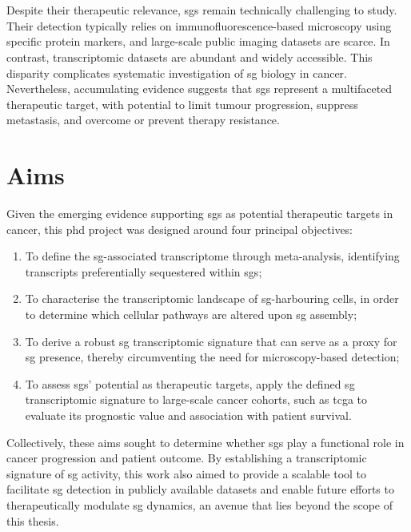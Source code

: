 \\
\\
Despite their therapeutic relevance, \glspl{sg} remain technically challenging to study. Their detection typically relies on immunofluorescence-based microscopy using specific protein markers\cite{glauninger_stressful_2022}, and large-scale public imaging datasets are scarce. In contrast, transcriptomic datasets are abundant and widely accessible\cite{tcga_research_network_cancer_nodate, schneider_voyager_2024}. This disparity complicates systematic investigation of \gls{sg} biology in cancer. Nevertheless, accumulating evidence suggests that \glspl{sg} represent a multifaceted therapeutic target, with potential to limit tumour progression, suppress metastasis, and overcome or prevent therapy resistance.

\section{Aims}

Given the emerging evidence supporting \glspl{sg} as potential therapeutic targets in cancer, this \gls{phd} project was designed around four principal objectives:

\begin{enumerate}
	\item To define the \gls{sg}-associated transcriptome through meta-analysis, identifying transcripts preferentially sequestered within \glspl{sg};
	\item To characterise the transcriptomic landscape of \gls{sg}-harbouring cells, in order to determine which cellular pathways are altered upon \gls{sg} assembly;
	\item To derive a robust \gls{sg} transcriptomic signature that can serve as a proxy for \gls{sg} presence, thereby circumventing the need for microscopy-based detection;
	\item To assess \glspl{sg}' potential as therapeutic targets, apply the defined \gls{sg} transcriptomic signature to large-scale cancer cohorts, such as \gls{tcga}\cite{network_cancer_nodate, heath_nci_2021} to evaluate its prognostic value and association with patient survival.
\end{enumerate}
\noindent
Collectively, these aims sought to determine whether \glspl{sg} play a functional role in cancer progression and patient outcome. By establishing a transcriptomic signature of \gls{sg} activity, this work also aimed to provide a scalable tool to facilitate \gls{sg} detection in publicly available datasets and enable future efforts to therapeutically modulate \gls{sg} dynamics, an avenue that lies beyond the scope of this thesis.

